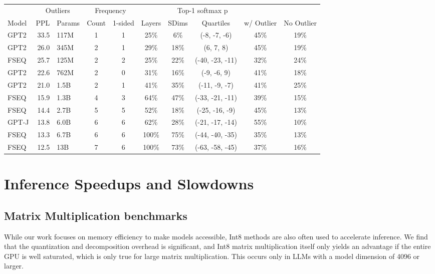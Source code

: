 \documentclass{article}
\begin{document}
\begin{table}[]
{\begin{tabular}{lrlccccccc}
   &
  \multicolumn{2}{c}{Outliers} &
  \multicolumn{2}{c}{Frequency} &
   &
  \multicolumn{2}{c}{Top-1 softmax p} \\ \cmidrule{4-7} \cmidrule{9-10}  
Model &
  \multicolumn{1}{l}{PPL\bf{}} &
  Params &
  Count &
  1-sided &
  Layers &
  SDims &
  Quartiles &
  w/ Outlier &
  No Outlier \\\toprule
GPT2  & 33.5 & 117M   & 1 & 1 & 25\%  & 6\%  & (-8, -7, -6)            & 45\% & 19\% \\
GPT2  & 26.0   & 345M   & 2 & 1 & 29\%  & 18\% & (6, 7, 8)                & 45\% & 19\% \\
FSEQ  & 25.7 & 125M  & 2 & 2 & 25\%  & 22\% & (-40, -23, -11)            & 32\%  & 24\% \\
GPT2  & 22.6 & 762M   & 2 & 0 & 31\%  & 16\% & (-9, -6, 9)               & 41\% & 18\% \\
GPT2  & 21.0   & 1.5B   & 2 & 1 & 41\%  & 35\% & (-11, -9, -7)    & 41\% & 25\% \\
FSEQ  & 15.9 & 1.3B  & 4 & 3 & 64\%  & 47\% & (-33, -21, -11) & 39\% & 15\% \\
FSEQ  & 14.4 & 2.7B  & 5 & 5 & 52\%  & 18\% & (-25, -16, -9)            & 45\% & 13\% \\
GPT-J & 13.8 & 6.0B   & 6 & 6 & 62\%  & 28\% & (-21, -17, -14)           & 55\% & 10\% \\\midrule
FSEQ  & 13.3 & 6.7B  & 6 & 6 & 100\% & 75\% & (-44, -40, -35)           & 35\% & 13\% \\
FSEQ  & 12.5 & 13B   & 7 & 6 & 100\% & 73\% & (-63, -58, -45)   & 37\% & 16\%\\\bottomrule
\end{tabular}}
\end{table}

\section{Inference Speedups and Slowdowns}
\label{app:inference}

\subsection{Matrix Multiplication benchmarks}

While our work focuses on memory efficiency to make models accessible, Int8 methods are also often used to accelerate inference. We find that the quantization and decomposition overhead is significant, and Int8 matrix multiplication itself only yields an advantage if the entire GPU is well saturated, which is only true for large matrix multiplication. This occurs only in LLMs with a model dimension of 4096 or larger.
\end{document}
